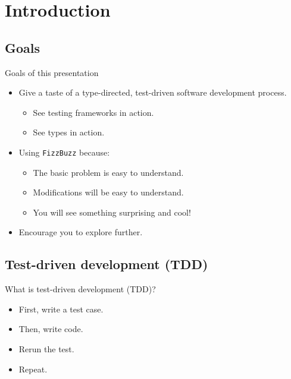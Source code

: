 
\section{Introduction}

\subsection{Goals}

\begin{frame}{Goals of this presentation}
  \begin{itemize}
  \item Give a taste of a \alert{type}-directed, \alert{test}-driven software development process.
    \begin{itemize}
    \item See testing frameworks in action.
    \item See types in action.
    \end{itemize}
  \item Using \texttt{FizzBuzz} because:
    \begin{itemize}
    \item The basic problem is easy to understand.
    \item Modifications will be easy to understand.
    \item You will see something surprising and cool!
    \end{itemize}
  \item Encourage you to explore further.
  \end{itemize}
\end{frame}

\subsection{Test-driven development (TDD)}

\begin{frame}{What is test-driven development (TDD)?}
  \begin{itemize}
  \item First, write a test case.
  \item Then, write code.
  \item Rerun the test.
  \item Repeat.
  \end{itemize}
\end{frame}

